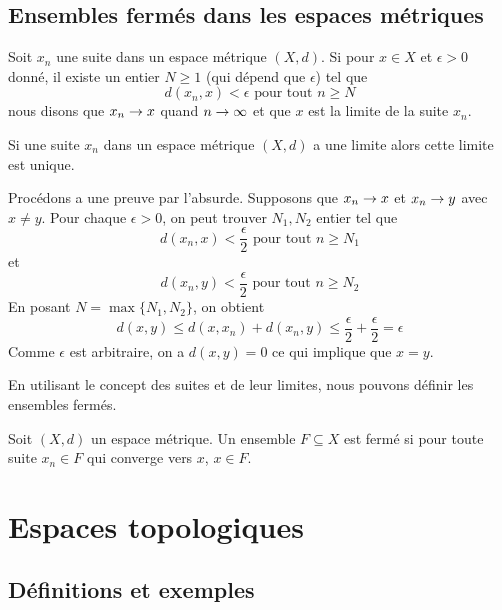 \documentclass[french]{article}
\begin{document}
\subsection{Ensembles fermés dans les espaces métriques}
\begin{definition}
  Soit $x_n$ une suite dans un espace métrique $(X, d)$. Si pour $x \in X$ et $\epsilon >0$ donné, il existe un entier $N \geq 1$ (qui dépend que $\epsilon$) tel que
  $$d(x_n, x) < \epsilon \text{ pour tout } n \geq N$$
  nous disons que $x_n \rightarrow x$ quand $n \rightarrow \infty$ et que $x$ est la limite de la suite $x_n$.
\end{definition}

\begin{lemme}
  Si une suite $x_n$ dans un espace métrique $(X, d)$ a une limite alors cette limite est unique.

  \tcblower
  \begin{preuve}
    Procédons a une preuve par l'absurde. Supposons que $x_n \rightarrow x$ et $x_n \rightarrow y$ avec $x \neq y$. Pour chaque $\epsilon > 0$, on peut trouver $N_1, N_2$ entier tel que
    $$d(x_n, x) < \frac{\epsilon}{2} \text{ pour tout } n \geq N_1$$
    et
    $$d(x_n, y) < \frac{\epsilon}{2} \text{ pour tout } n \geq N_2$$
    En posant $N = \max\{N_1, N_2\}$, on obtient
    $$d(x, y) \leq d(x, x_n) + d(x_n, y) \leq \frac{\epsilon}{2} + \frac{\epsilon}{2} = \epsilon$$
    Comme $\epsilon$ est arbitraire, on a $d(x, y) = 0$ ce qui implique que $x = y$.
  \end{preuve}
\end{lemme}
En utilisant le concept des suites et de leur limites, nous pouvons définir les ensembles fermés.

\begin{definition}
  Soit $(X, d)$ un espace métrique. Un ensemble $F \subseteq X$ est fermé si pour toute suite $x_n \in F$ qui converge vers $x$, $x \in F$.
\end{definition}


\section{Espaces topologiques}
\subsection{Définitions et exemples}
\end{document}

